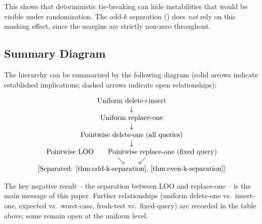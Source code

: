 This shows that deterministic tie-breaking can hide instabilities that would
be visible under randomization. The odd-$k$ separation
() does {\em not} rely on this masking effect,
since the margins are strictly non-zero throughout.

\subsection{Summary Diagram}

The hierarchy can be summarized by the following diagram (solid arrows indicate
established implications; dashed arrows indicate open relationships):

\[
\begin{array}{c}
\text{Uniform delete+insert} \\
\downarrow \\
\text{Uniform replace-one} \\
\downarrow \\
\text{Pointwise delete-one (all queries)} \\
\downarrow \\
\text{Pointwise LOO} \qquad \text{Pointwise replace-one (fixed query)} \\
\searrow \qquad \swarrow \\
\text{[Separated: \Cref{thm:odd-k-separation}, \Cref{thm:even-k-separation}]}
\end{array}
\]

The key negative result -- the separation between LOO and replace-one -- is
the main message of this paper. Further relationships (uniform delete-one vs.\
insert-one, expected vs.\ worst-case, fresh-test vs.\ fixed-query) are
recorded in the table above; some remain open at the uniform level.


